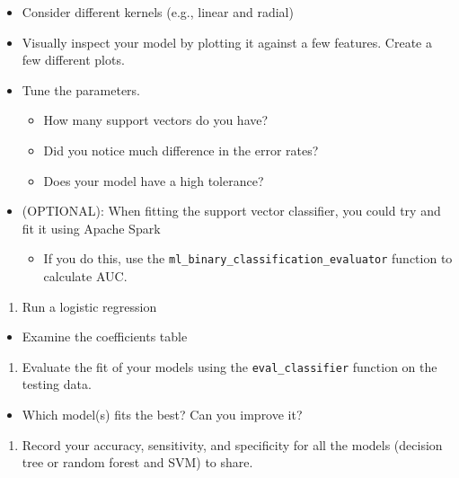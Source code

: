 \documentclass[
]{book}
\providecommand{\tightlist}{%
  \setlength{\itemsep}{0pt}\setlength{\parskip}{0pt}}
\begin{document}
\begin{itemize}
\tightlist
\item
  Consider different kernels (e.g., linear and radial)
\item
  Visually inspect your model by plotting it against a few features. Create a few different plots.
\item
  Tune the parameters.

  \begin{itemize}
  \tightlist
  \item
    How many support vectors do you have?
  \item
    Did you notice much difference in the error rates?
  \item
    Does your model have a high tolerance?
  \end{itemize}
\item
  (OPTIONAL): When fitting the support vector classifier, you could try and fit it using Apache Spark

  \begin{itemize}
  \tightlist
  \item
    If you do this, use the \texttt{ml\_binary\_classification\_evaluator} function to calculate AUC.
  \end{itemize}
\end{itemize}

\begin{enumerate}
\def\labelenumi{\arabic{enumi}.}
\setcounter{enumi}{3}
\tightlist
\item
  Run a logistic regression
\end{enumerate}

\begin{itemize}
\tightlist
\item
  Examine the coefficients table
\end{itemize}

\begin{enumerate}
\def\labelenumi{\arabic{enumi}.}
\setcounter{enumi}{4}
\tightlist
\item
  Evaluate the fit of your models using the \texttt{eval\_classifier} function on the testing data.
\end{enumerate}

\begin{itemize}
\tightlist
\item
  Which model(s) fits the best? Can you improve it?
\end{itemize}

\begin{enumerate}
\def\labelenumi{\arabic{enumi}.}
\setcounter{enumi}{5}
\tightlist
\item
  Record your accuracy, sensitivity, and specificity for all the models (decision tree or random forest and SVM) to share.
\end{enumerate}
\end{document}
